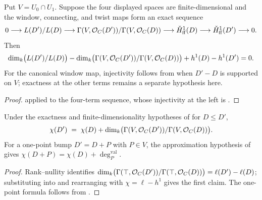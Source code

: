 \begin{theorem}
  \label{thm:adelic_ledger_alternating}
  \leanok
  Put \(V=U_0\cap U_1\).  Suppose the four displayed spaces are
  finite-dimensional and the window, connecting, and twist maps form an
  exact sequence
  \[
    0\longrightarrow L(D')/L(D)
      \longrightarrow \Gamma(V,\mathcal{O}_{C}(D'))/\Gamma(V,\mathcal{O}_{C}(D))
      \longrightarrow\check H^1_{\mathrm{ff}}(D)
      \longrightarrow\check H^1_{\mathrm{ff}}(D')\longrightarrow0.
  \]
  Then
  \[
    \dim_k\bigl(L(D')/L(D)\bigr) - \dim_k\bigl(\Gamma(V,\mathcal{O}_{C}(D'))/
      \Gamma(V,\mathcal{O}_{C}(D))\bigr) + h^1(D) - h^1(D') = 0.
  \]
  For the canonical window map, injectivity follows from
   when \(D'-D\) is supported on
  \(V\); exactness at the other terms remains a separate hypothesis here.
\end{theorem}
\begin{proof}
  \leanok
   applied to the four-term
  sequence, whose injectivity at the left is
  .
\end{proof}

\begin{theorem}
  \label{thm:adelic_chi_additivity}
  \leanok
  Under the exactness and finite-dimensionality hypotheses of
   for \(D\le D'\),
  \[
    \chi(D') \;=\; \chi(D) + \dim_k\bigl(\Gamma(V,\mathcal{O}_{C}(D'))/
      \Gamma(V,\mathcal{O}_{C}(D))\bigr).
  \]
  For a one-point bump \(D'=D+P\) with \(P\in V\), the approximation hypothesis of
   gives
  \(\chi(D+P)=\chi(D)+\deg_P^{\mathrm{val}}\).
\end{theorem}
\begin{proof}
  \leanok
  Rank--nullity identifies
  \(\dim_k\bigl(\Gamma(\top,\mathcal{O}_{C}(D'))/\Gamma(\top,\mathcal{O}_{C}(D))\bigr)
  = \ell(D') - \ell(D)\); substituting into
   and rearranging with
  \(\chi = \ell - h^1\) gives the first claim.  The one-point formula
  follows from .
\end{proof}

